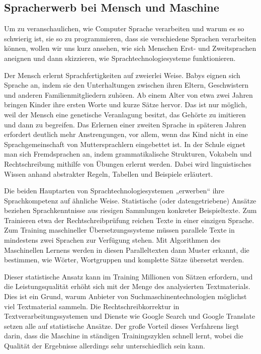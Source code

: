\begin{multicols}{2}
\subsection{Spracherwerb bei Mensch und Maschine}

Um zu veranschaulichen, wie Computer Sprache verarbeiten und warum es so schwierig ist, sie so zu programmieren, dass sie verschiedene Sprachen verarbeiten können, wollen wir uns kurz ansehen, wie sich Menschen Erst- und Zweitsprachen aneignen und dann skizzieren, wie Sprachtechnologiesysteme funktionieren.


Der Mensch erlernt Sprachfertigkeiten auf zweierlei Weise. Babys eignen sich Sprache an, indem sie den Unterhaltungen zwischen ihren Eltern, Geschwistern und anderen Familienmitgliedern zuhören. Ab einem Alter von etwa zwei Jahren bringen Kinder ihre ersten Worte und kurze Sätze hervor. Das ist nur möglich, weil der Mensch eine genetische Veranlagung besitzt, das Gehörte zu imitieren und dann zu begreifen. 
Das Erlernen einer zweiten Sprache in späteren Jahren erfordert deutlich mehr Anstrengungen, vor allem, wenn das Kind nicht in eine Sprachgemeinschaft von Muttersprachlern eingebettet ist. In der Schule eignet man sich Fremdsprachen an, indem grammatikalische Strukturen, Vokabeln und Rechtschreibung mithilfe von Übungen erlernt werden. Dabei wird linguistisches Wissen anhand abstrakter Regeln, Tabellen und Beispiele erläutert.

Die beiden Hauptarten von Sprachtechnologiesystemen „erwerben“ ihre Sprachkompetenz auf ähnliche Weise. Statistische (oder datengetriebene) Ansätze beziehen Sprachkenntnisse aus riesigen Sammlungen konkreter Beispieltexte. Zum Trainieren etwa der Rechtschreibprüfung reichen Texte in einer einzigen Sprache. Zum Training maschineller Übersetzungssysteme müssen parallele Texte in mindestens zwei Sprachen zur Verfügung stehen. Mit Algorithmen des Maschinellen Lernens werden in diesen Paralleltexten dann Muster erkannt, die bestimmen, wie Wörter, Wortgruppen und komplette Sätze übersetzt werden.

Dieser statistische Ansatz kann im Training Millionen von Sätzen erfordern, und die Leistungsqualität erhöht sich mit der Menge des analysierten Textmaterials. Dies ist ein Grund, warum Anbieter von Suchmaschinentechnologien möglichst viel Textmaterial sammeln. Die Rechtschreibkorrektur in Textverarbeitungssystemen und Dienste wie Google Search und Google Translate setzen alle auf statistische Ansätze. Der große Vorteil dieses Verfahrens liegt darin, dass die Maschine in ständigen Trainingszyklen schnell lernt, wobei die Qualität der Ergebnisse allerdings sehr unterschiedlich sein kann.


\end{multicols}
